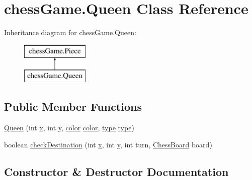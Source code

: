 \hypertarget{classchess_game_1_1_queen}{}\section{chess\+Game.\+Queen Class Reference}
\label{classchess_game_1_1_queen}
Inheritance diagram for chess\+Game.\+Queen\+:\begin{figure}[H]
\begin{center}
\leavevmode
\includegraphics[height=2.000000cm]{classchess_game_1_1_queen}
\end{center}
\end{figure}
\subsection*{Public Member Functions}
\begin{DoxyCompactItemize}
\item 
\hyperlink{classchess_game_1_1_queen_add4682e5e02e4a89a518c4f12eae9346}{Queen} (int \hyperlink{classchess_game_1_1_piece_aeb2d3374492005d799aa6b7b85be40e7}{x}, int \hyperlink{classchess_game_1_1_piece_a56e4d8d18eca3fd03a6bd5d6112d6359}{y}, \hyperlink{classchess_game_1_1_piece_ad5117cbbbaebf3a27c4f3c2bcbd6678b}{color} \hyperlink{classchess_game_1_1_piece_ad5117cbbbaebf3a27c4f3c2bcbd6678b}{color}, \hyperlink{classchess_game_1_1_piece_a1370c7f61581a1b72fa8ac2fd1af70a2}{type} \hyperlink{classchess_game_1_1_piece_a1370c7f61581a1b72fa8ac2fd1af70a2}{type})
\item 
boolean \hyperlink{classchess_game_1_1_queen_af27e38067888a18cb60dc3f9f7e2a87c}{check\+Destination} (int \hyperlink{classchess_game_1_1_piece_aeb2d3374492005d799aa6b7b85be40e7}{x}, int \hyperlink{classchess_game_1_1_piece_a56e4d8d18eca3fd03a6bd5d6112d6359}{y}, int turn, \hyperlink{classchess_game_1_1_chess_board}{Chess\+Board} board)
\end{DoxyCompactItemize}


\subsection{Constructor \& Destructor Documentation}
\hypertarget{classchess_game_1_1_queen_add4682e5e02e4a89a518c4f12eae9346}{}\label{classchess_game_1_1_queen_add4682e5e02e4a89a518c4f12eae9346} 
